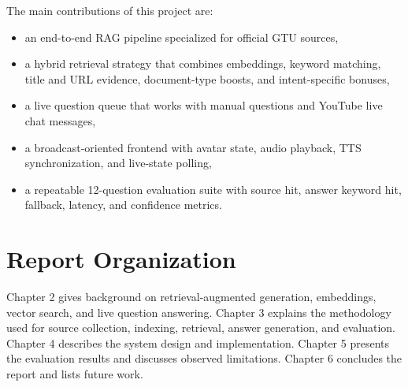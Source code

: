 The main contributions of this project are:

\begin{itemize}
    \item an end-to-end RAG pipeline specialized for official GTU sources,
    \item a hybrid retrieval strategy that combines embeddings, keyword matching, title and URL evidence, document-type boosts, and intent-specific bonuses,
    \item a live question queue that works with manual questions and YouTube live chat messages,
    \item a broadcast-oriented frontend with avatar state, audio playback, TTS synchronization, and live-state polling,
    \item a repeatable 12-question evaluation suite with source hit, answer keyword hit, fallback, latency, and confidence metrics.
\end{itemize}

\section{Report Organization}

Chapter 2 gives background on retrieval-augmented generation, embeddings, vector search, and live question answering. Chapter 3 explains the methodology used for source collection, indexing, retrieval, answer generation, and evaluation. Chapter 4 describes the system design and implementation. Chapter 5 presents the evaluation results and discusses observed limitations. Chapter 6 concludes the report and lists future work.
